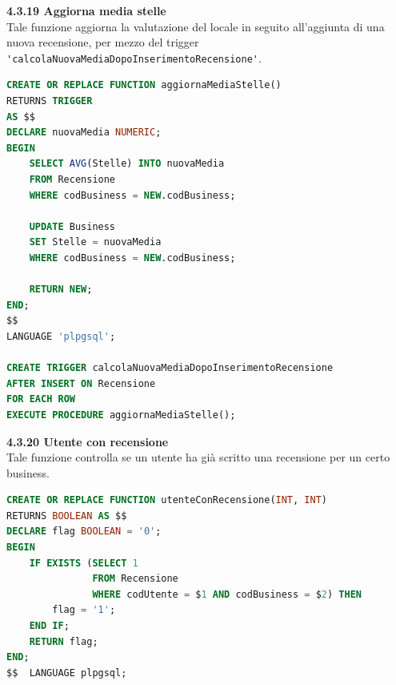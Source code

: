 \documentclass[a4paper,12pt]{article}
\begin{document}
\newpage\null{}\setcounter{page}{24}
\vspace{-2cm}
{\flushleft \bf 4.3.19  Aggiorna media stelle}\\
Tale funzione aggiorna la valutazione del locale in seguito all'aggiunta di una
nuova recensione, per mezzo del trigger \verb|'calcolaNuovaMediaDopoInserimentoRecensione'|.
\begin{lstlisting}[language=SQL]
CREATE OR REPLACE FUNCTION aggiornaMediaStelle()
RETURNS TRIGGER
AS $$
DECLARE nuovaMedia NUMERIC;
BEGIN
    SELECT AVG(Stelle) INTO nuovaMedia
    FROM Recensione
    WHERE codBusiness = NEW.codBusiness;

    UPDATE Business
    SET Stelle = nuovaMedia
    WHERE codBusiness = NEW.codBusiness;

    RETURN NEW;
END;
$$
LANGUAGE 'plpgsql';

CREATE TRIGGER calcolaNuovaMediaDopoInserimentoRecensione
AFTER INSERT ON Recensione
FOR EACH ROW
EXECUTE PROCEDURE aggiornaMediaStelle();
\end{lstlisting}

\vspace*{+1cm}

{\flushleft \bf 4.3.20  Utente con recensione}\\
Tale funzione controlla se un utente ha già scritto una recensione per un certo
business.
\begin{lstlisting}[language=SQL]
CREATE OR REPLACE FUNCTION utenteConRecensione(INT, INT)
RETURNS BOOLEAN AS $$
DECLARE flag BOOLEAN = '0';
BEGIN
	IF EXISTS (SELECT 1 
			   FROM Recensione 
			   WHERE codUtente = $1 AND codBusiness = $2) THEN
		flag = '1';
	END IF;
	RETURN flag;
END;
$$  LANGUAGE plpgsql;
\end{lstlisting}

\newpage
\end{document}
